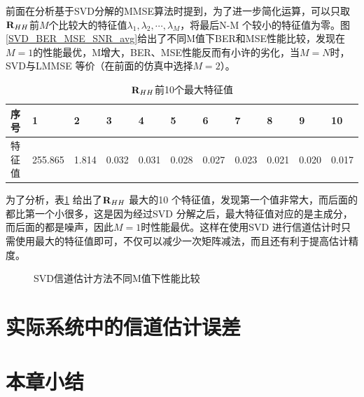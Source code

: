 前面在分析基于SVD分解的MMSE算法时提到，为了进一步简化运算，可以只取$\textbf R_{HH}$前$M$个比较大的特征值$\lambda_1,\lambda_2,\cdots,\lambda_M$，将最后N-M 个较小的特征值为零。图\ref{SVD_BER_MSE_SNR_avg}给出了不同M值下BER和MSE性能比较，发现在$M=1$的性能最优，M增大，BER、MSE性能反而有小许的劣化，当$M=N$时，SVD与LMMSE 等价（在前面的仿真中选择$M=2$）。
\begin{table}[ht]
    \caption{$\textbf R_{HH}$前10个最大特征值}
    \label{tab:modOrder}
    \centering
    \begin{tabular}{lllllllllll}
        \toprule
        序号 & 1 & 2& 3& 4&5& 6& 7& 8& 9&10 \\
        \midrule
        特征值 &255.865 &1.814&0.032&0.031 & 0.028 & 0.027&0.023&0.021&0.020&0.017\\
        \bottomrule
    \end{tabular}
    \label{tab:tezhengzhi}
\end{table}
为了分析，表\ref{tab:tezhengzhi} 给出了$\textbf R_{HH}$ 最大的10 个特征值，发现第一个值非常大，而后面的都比第一个小很多，这是因为经过SVD 分解之后，最大特征值对应的是主成分，而后面的都是噪声，因此$M=1$时性能最优。这样在使用SVD 进行信道估计时只需使用最大的特征值即可，不仅可以减少一次矩阵减法，而且还有利于提高估计精度。
\begin{figure}[htbp]
    \centering
    \caption{SVD信道估计方法不同M值下性能比较}
    \label{fig:SVD_BER_MSE_SNR_avg}
\end{figure}
\section{实际系统中的信道估计误差}
\section{本章小结}
